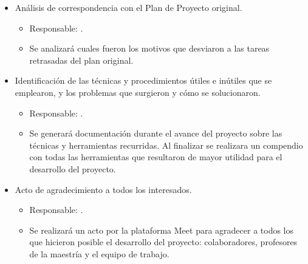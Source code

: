 \documentclass[
11pt, %
codirector, %
]{charter}
\begin{document}
\begin{itemize}
	\item Análisis de correspondencia con el Plan de Proyecto original.
	      \begin{itemize}
		      \item Responsable: \authorname\hspace{1px}.
		      \item Se analizará cuales fueron los motivos que desviaron a las tareas retrasadas del plan original.
	      \end{itemize}
	\item Identificación de las técnicas y procedimientos útiles e inútiles que se emplearon, y los problemas que surgieron y cómo se solucionaron.
	      \begin{itemize}
		      \item Responsable: \authorname\hspace{1px}.
		      \item Se generará documentación durante el avance del proyecto sobre las técnicas y herramientas recurridas. Al finalizar se realizara un compendio con todas las herramientas que resultaron de mayor utilidad para el desarrollo del proyecto.
	      \end{itemize}
	\item Acto de agradecimiento a todos los interesados.
	      \begin{itemize}
		      \item Responsable: \authorname\hspace{1px}.
		      \item Se realizará un acto por la plataforma Meet para agradecer a todos los que hicieron posible el desarrollo del proyecto: colaboradores, profesores de la maestría y el equipo de trabajo.
	      \end{itemize}
\end{itemize}
\end{document}
